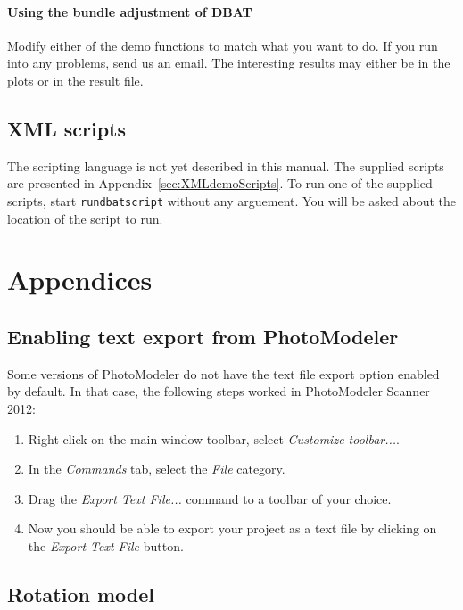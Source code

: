 \documentclass{article}
\begin{document}
\paragraph{Using the bundle adjustment of DBAT}

Modify either of the demo functions to match what you want to do. If
you run into any problems, send us an email. The interesting results
may either be in the plots or in the result file.

\newpage
\subsection{XML scripts}
\label{sec:xml}

The scripting language is not yet described in this manual. The
supplied scripts are presented in Appendix~\ref{sec:XMLdemoScripts}.
To run one of the supplied scripts, start \texttt{rundbatscript}
without any arguement. You will be asked about the location of the
script to run.

\newpage
 


\newpage

\appendix

\section{Appendices}

\subsection{Enabling text export from PhotoModeler}
\label{sec:enableTextExport}

Some versions of PhotoModeler do not have the text file export option
enabled by default. In that case, the following steps worked in
PhotoModeler Scanner 2012:
\begin{enumerate}
\item Right-click on the main window toolbar, select \emph{Customize toolbar...}.
\item In the \emph{Commands} tab, select the \emph{File} category.
\item Drag the \emph{Export Text File...} command to a toolbar of
  your choice.
\item Now you should be able to export your project as a text file by
  clicking on the \emph{Export Text File} button.
\end{enumerate}


\subsection{Rotation model}
\end{document}
